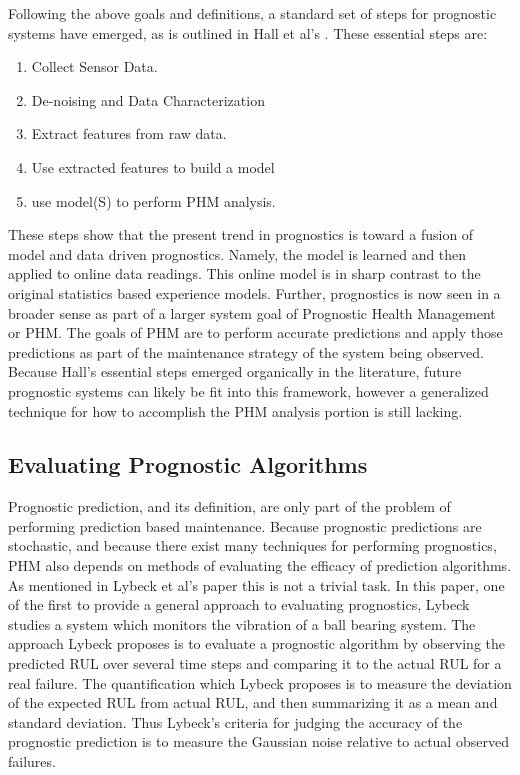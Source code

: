 \documentclass[12pt]{article}
\begin{document}
Following the above goals and definitions, a standard set of steps for
prognostic systems have emerged, as is outlined in Hall et al's
\cite{6024332}.  These essential steps are:
\begin{enumerate}
  \item Collect Sensor Data.
  \item De-noising and Data Characterization
  \item Extract features from raw data.
  \item Use extracted features to build a model
  \item use model(S) to perform PHM analysis.
\end{enumerate}
These steps show that the present trend in prognostics is toward a
fusion of model and data driven prognostics.  Namely, the model is
learned and then applied to online data readings.  This online model
is in sharp contrast to the original statistics based experience
models.  Further, prognostics is now seen in a broader sense as part
of a larger system goal of Prognostic Health Management or PHM.  The
goals of PHM are to perform accurate predictions and apply those
predictions as part of the maintenance strategy of the system being
observed.  Because Hall's essential steps emerged organically in the
literature, future prognostic systems can likely be fit into this
framework, however a generalized technique for how to accomplish the
PHM analysis portion is still lacking.

\subsection{Evaluating Prognostic Algorithms}
Prognostic prediction, and its definition, are only part of the
problem of performing prediction based maintenance.  Because
prognostic predictions are stochastic, and because there exist many
techniques for performing prognostics, PHM also depends on methods of
evaluating the efficacy of prediction algorithms.  As mentioned in
Lybeck et al's paper \cite{4161637} this is not a trivial task.  In
this paper, one of the first to provide a general approach to
evaluating prognostics, Lybeck studies a system which monitors the
vibration of a ball bearing system.  The approach Lybeck proposes is
to evaluate a prognostic algorithm by observing the predicted RUL over
several time steps and comparing it to the actual RUL for a real
failure.  The quantification which Lybeck proposes is to measure the
deviation of the expected RUL from actual RUL, and then summarizing it
as a mean and standard deviation.  Thus Lybeck's criteria for judging
the accuracy of the prognostic prediction is to measure the Gaussian
noise relative to actual observed failures.
\end{document}
